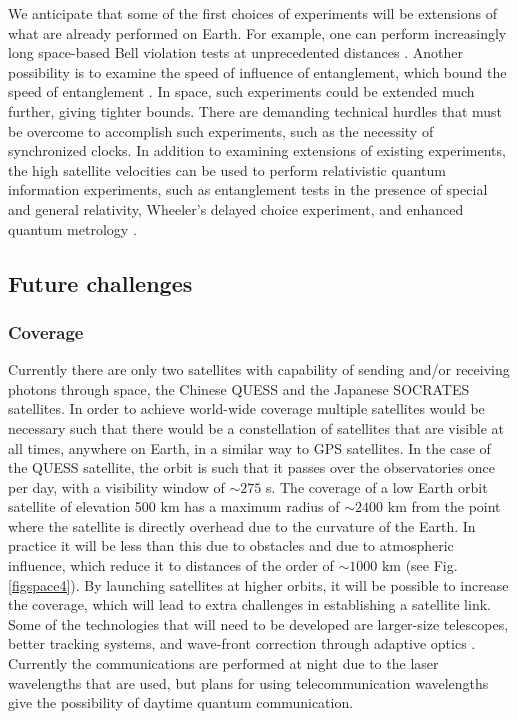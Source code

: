 \documentclass[aps,rmp,reprint,amsmath,amssymb,graphicx,longbibliography]{revtex4-1}
\begin{document}
We anticipate that some of the first choices of experiments will be extensions of what are already performed on Earth.  For example, one can perform increasingly long space-based Bell violation tests at unprecedented distances \cite{yin2017satellite}.  Another possibility is to examine the speed of influence of entanglement, which bound the speed of entanglement \cite{yin2013lower}.  In space, such experiments could be extended much further, giving tighter bounds.  There are demanding technical hurdles that must be overcome to accomplish such experiments, such as the necessity of synchronized clocks. In addition to examining extensions of existing experiments, the high satellite velocities can be used to perform relativistic quantum information experiments, such as entanglement tests in the presence of special and general relativity, Wheeler's delayed choice experiment, and enhanced quantum metrology \cite{kaltenbaek2003proof,scheidl2013quantum,ahmadi2014relativistic}.  












\subsection{Future challenges}

\subsubsection{Coverage}

Currently there are only two satellites with capability of sending and/or receiving photons through space, the Chinese QUESS and the Japanese SOCRATES satellites.  In order to achieve world-wide coverage multiple satellites would be necessary such that there would be a constellation of satellites that are visible at all times, anywhere on Earth, in a similar way to GPS satellites. In the case of the QUESS satellite, the orbit is such that it passes over the observatories once per day, with a visibility window of $ \sim 275 $ s.  The coverage of a low Earth orbit satellite of elevation 500 km has a maximum radius of $ \sim 2400 $ km from the point where the satellite is directly overhead due to the curvature of the Earth.  In practice it will be less than this due to obstacles and due to atmospheric influence, which reduce it to distances of the order of $ \sim 1000 $ km (see Fig. \ref{figspace4}). By launching satellites at higher orbits, it will be possible to increase the coverage, which will lead to extra challenges in establishing a satellite link.  Some of the technologies that will need to be developed are larger-size telescopes, better tracking systems, and wave-front correction through adaptive optics \cite{liao2017satellite}.  Currently the communications are performed at night due to the laser wavelengths that are used, but plans for using telecommunication wavelengths give the possibility of daytime quantum communication. 
\end{document}
